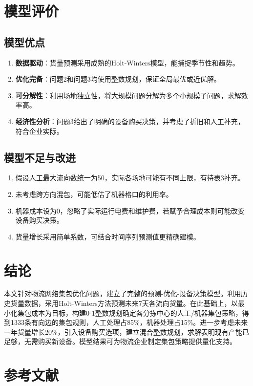 \documentclass[12pt,a4paper]{ctexart}
\begin{document}
\section{模型评价}

\subsection{模型优点}
\begin{enumerate}
    \item \textbf{数据驱动}：货量预测采用成熟的Holt-Winters模型，能捕捉季节性和趋势。
    \item \textbf{优化完备}：问题2和问题3均使用整数规划，保证全局最优或近优解。
    \item \textbf{可分解性}：利用场地独立性，将大规模问题分解为多个小规模子问题，求解效率高。
    \item \textbf{经济性分析}：问题3给出了明确的设备购买决策，并考虑了折旧和人工补充，符合企业实际。
\end{enumerate}

\subsection{模型不足与改进}
\begin{enumerate}
    \item 假设人工最大流向数统一为50，实际各场地可能有不同上限，有待表3补充。
    \item 未考虑跨方向混包，可能低估了机器格口的利用率。
    \item 机器成本设为0，忽略了实际运行电费和维护费，若赋予合理成本则可能改变设备购买决策。
    \item 货量增长采用简单系数，可结合时间序列预测值更精确建模。
\end{enumerate}

\section{结论}

本文针对物流网络集包优化问题，建立了完整的预测-优化-设备决策模型。利用历史货量数据，采用Holt-Winters方法预测未来7天各流向货量。在此基础上，以最小化集包成本为目标，构建0-1整数规划确定各分拣中心的人工/机器集包策略，得到1333条有向边的集包规则，人工处理占85\%，机器处理占15\%。进一步考虑未来一年货量增长20\%，引入设备购买选项，建立混合整数规划，求解表明现有产能已足够，无需购买新设备。模型结果可为物流企业制定集包策略提供量化支持。

\section*{参考文献}
\end{document}

